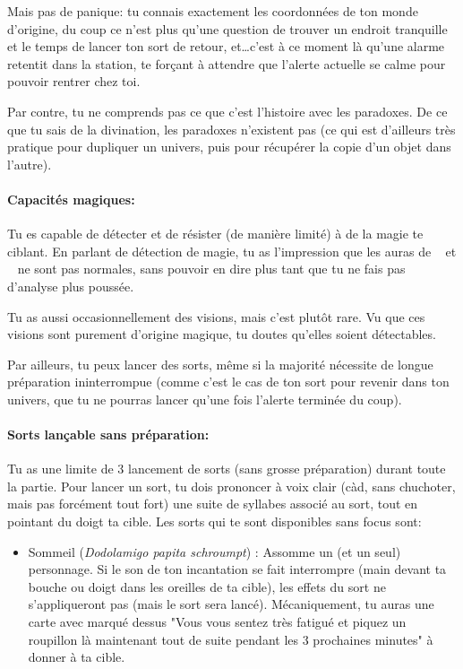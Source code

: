 {	\par Mais pas de panique: tu connais exactement les coordonnées de ton monde d'origine, du coup ce n'est plus qu'une question de trouver un endroit tranquille et le temps de lancer ton sort de retour, et\dots c'est à ce moment là qu'une alarme retentit dans la station, te forçant à attendre que l'alerte actuelle se calme pour pouvoir rentrer chez toi.
	
	\par Par contre, tu ne comprends pas ce que c'est l'histoire avec les paradoxes. De ce que tu sais de la divination, les paradoxes n'existent pas (ce qui est d'ailleurs très pratique pour dupliquer un univers, puis pour récupérer la copie d'un objet dans l'autre).
	
	
	\paragraph{Capacités magiques:} Tu es capable de détecter et de résister (de manière limité) à de la magie te ciblant. En parlant de détection de magie, tu as l'impression que les auras de \nmPlayerXI ~ et \nmPlayerIX ~ ne sont pas normales, sans pouvoir en dire plus tant que tu ne fais pas d'analyse plus poussée.
	
	\par Tu as aussi occasionnellement des visions, mais c'est plutôt rare. Vu que ces visions sont purement d'origine magique, tu doutes qu'elles soient détectables.
	
	\par Par ailleurs, tu peux lancer des sorts, même si la majorité nécessite de longue préparation ininterrompue (comme c'est le cas de ton sort pour revenir dans ton univers, que tu ne pourras lancer qu'une fois l'alerte terminée du coup). 
	
	\paragraph{Sorts lançable sans préparation:} Tu as une limite de 3 lancement de sorts (sans grosse préparation) durant toute la partie. Pour lancer un sort, tu dois prononcer à voix clair (càd, sans chuchoter, mais pas forcément tout fort) une suite de syllabes associé au sort, tout en pointant du doigt ta cible. Les sorts qui te sont disponibles sans focus sont:
	\begin{itemize}
		\item Sommeil (\emph{Dodolamigo papita schroumpt}) : Assomme un (et un seul) personnage. Si le son de ton incantation se fait interrompre (main devant ta bouche ou doigt dans les oreilles de ta cible), les effets du sort ne s'appliqueront pas (mais le sort sera lancé). Mécaniquement, tu auras une carte avec marqué dessus "Vous vous sentez très fatigué et piquez un roupillon là maintenant tout de suite pendant les 3 prochaines minutes" à donner à ta cible.
		

\end{itemize}}
